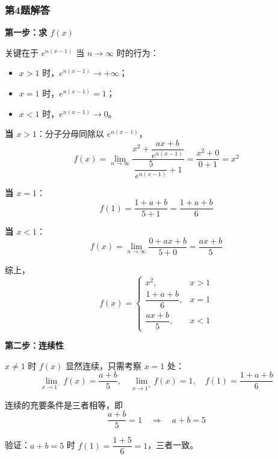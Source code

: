\documentclass[./book.tex]{subfiles}
\begin{document}
    \subsubsection*{第4题解答}
    \begin{analysisbox}[解]
        \textbf{第一步：求 $f(x)$}

        关键在于 $e^{n(x-1)}$ 当 $n \to \infty$ 时的行为：
        \begin{itemize}
            \item $x > 1$ 时，$e^{n(x-1)} \to +\infty$；
            \item $x = 1$ 时，$e^{n(x-1)} = 1$；
            \item $x < 1$ 时，$e^{n(x-1)} \to 0$。
        \end{itemize}

        \medskip

        \textbf{当 $x > 1$}：分子分母同除以 $e^{n(x-1)}$，
        \[
            f(x) = \lim_{n\to\infty} \frac{x^2 + \dfrac{ax+b}{e^{n(x-1)}}}{\dfrac{5}{e^{n(x-1)}} + 1} = \frac{x^2 + 0}{0 + 1} = x^2
        \]

        \textbf{当 $x = 1$}：
        \[
            f(1) = \frac{1 + a + b}{5 + 1} = \frac{1 + a + b}{6}
        \]

        \textbf{当 $x < 1$}：
        \[
            f(x) = \lim_{n\to\infty} \frac{0 + ax + b}{5 + 0} = \frac{ax + b}{5}
        \]

        综上，
        \[
            f(x) = \begin{cases}
                       x^2, & x > 1 \\[0.3em]
                       \dfrac{1+a+b}{6}, & x = 1 \\[0.3em]
                       \dfrac{ax+b}{5}, & x < 1
            \end{cases}
        \]

        \medskip

        \textbf{第二步：连续性}

        $x \neq 1$ 时 $f(x)$ 显然连续，只需考察 $x = 1$ 处：
        \[
            \lim_{x\to 1^-} f(x) = \frac{a+b}{5}, \quad
            \lim_{x\to 1^+} f(x) = 1, \quad
            f(1) = \frac{1+a+b}{6}
        \]

        连续的充要条件是三者相等，即
        \[
            \frac{a+b}{5} = 1 \quad\Longrightarrow\quad a + b = 5
        \]

        验证：$a+b=5$ 时 $f(1) = \dfrac{1+5}{6} = 1$，三者一致。

        \medskip


\end{analysisbox}
\end{document}
